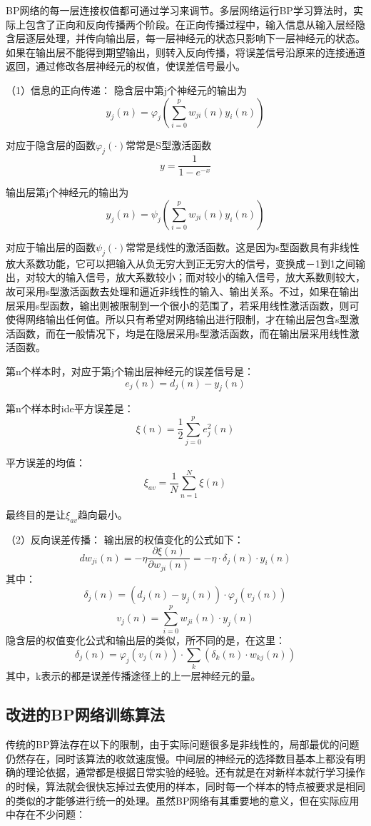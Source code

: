 \documentclass[UTF8]{ctexart}
\begin{document}
BP网络的每一层连接权值都可通过学习来调节。多层网络运行BP学习算法时，实际上包含了正向和反向传播两个阶段。在正向传播过程中，输入信息从输入层经隐含层逐层处理，并传向输出层，每一层神经元的状态只影响下一层神经元的状态。如果在输出层不能得到期望输出，则转入反向传播，将误差信号沿原来的连接通道返回，通过修改各层神经元的权值，使误差信号最小。

（1）信息的正向传递：
隐含层中第j个神经元的输出为
$$ y_{j}(n)=\varphi_j(\sum^{p}_{i=0}w_{ji}(n)y_i(n)) $$

对应于隐含层的函数$ \varphi_j(\cdot) $常常是S型激活函数
$$ y=\frac{1}{1-e^{-x}} $$

输出层第j个神经元的输出为
$$ y_j(n)=\psi_j(\sum^{p}_{i=0}w_{ji}(n)y_i(n)) $$

对应于输出层的函数$ \psi_j(\cdot) $常常是线性的激活函数。这是因为s型函数具有非线性放大系数功能，它可以把输入从负无穷大到正无穷大的信号，变换成－1到1之间输出，对较大的输入信号，放大系数较小；而对较小的输入信号，放大系数则较大，故可采用s型激活函数去处理和逼近非线性的输入、输出关系。不过，如果在输出层采用s型函数，输出则被限制到一个很小的范围了，若采用线性激活函数，则可使得网络输出任何值。所以只有希望对网络输出进行限制，才在输出层包含s型激活函数，而在一般情况下，均是在隐层采用s型激活函数，而在输出层采用线性激活函数。

第n个样本时，对应于第j个输出层神经元的误差信号是：
$$ e_j(n)=d_{j}(n)-y_j(n) $$

第n个样本时ide平方误差是：
$$ \xi(n)=\frac{1}{2}\sum^{p}_{j=0}e^{2}_{j}(n)  $$

平方误差的均值：
$$ \xi_{av}=\frac{1}{N}\sum^{N}_{n=1}\xi(n) $$

最终目的是让$ \xi_{av} $趋向最小。

（2）反向误差传播：
输出层的权值变化的公式如下：
$$ dw_{ji}(n)=-\eta\frac{\partial\xi(n)}{\partial w_{ji}(n)}=-\eta\cdot\delta_j(n)\cdot y_i(n) $$
其中：
$$ \delta_j(n)=(d_j(n)-y_j(n))\cdot \varphi_j(v_j(n)) $$
$$ v_j(n)=\sum^{p}_{i=0}w_{ji}(n)\cdot y_j(n) $$
隐含层的权值变化公式和输出层的类似，所不同的是，在这里：
$$ \delta_j(n)=\varphi_j(v_j(n))\cdot \sum_k(\delta_k(n)\cdot w_{kj}(n)) $$
其中，k表示的都是误差传播途径上的上一层神经元的量。

\subsection{改进的BP网络训练算法}
传统的BP算法存在以下的限制，由于实际问题很多是非线性的，局部最优的问题仍然存在，同时该算法的收敛速度慢。中间层的神经元的选择数目基本上都没有明确的理论依据，通常都是根据日常实验的经验。还有就是在对新样本就行学习操作的时候，算法就会很快忘掉过去使用的样本，同时每一个样本的特点被要求是相同的类似的才能够进行统一的处理。虽然BP网络有其重要地的意义，但在实际应用中存在不少问题：
\end{document}
